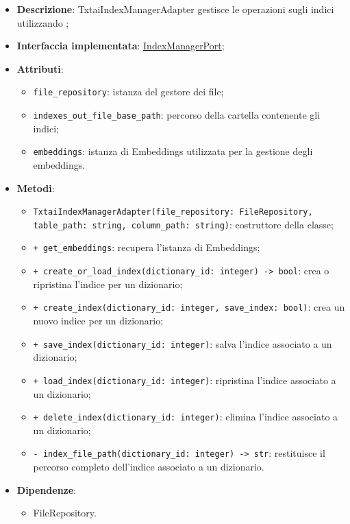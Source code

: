 \begin{itemize}
    \item \textbf{Descrizione}: TxtaiIndexManagerAdapter gestisce le operazioni  sugli indici utilizzando ;
    \item \textbf{Interfaccia implementata}: \hyperref[IndexManagerPort]{IndexManagerPort};
    \item \textbf{Attributi}:
    \begin{itemize}
        \item \texttt{file\_repository}: istanza del gestore dei file;
        \item \texttt{indexes\_out\_file\_base\_path}: percorso della cartella contenente gli indici;
        \item \texttt{embeddings}: istanza di Embeddings utilizzata per la gestione degli embeddings.
    \end{itemize}
    \item \textbf{Metodi}:
    \begin{itemize}
        \item \texttt{TxtaiIndexManagerAdapter(file\_repository: FileRepository, table\_path: string, column\_path: string)}: costruttore della classe;
        \item \texttt{+ get_embeddings}: recupera l'istanza di Embeddings;
        \item \texttt{+ create\_or\_load\_index(dictionary_id: integer) -> bool}: crea o ripristina l'indice per un dizionario;
        \item \texttt{+ create\_index(dictionary_id: integer, save_index: bool)}: crea un nuovo indice per un dizionario;
        \item \texttt{+ save\_index(dictionary_id: integer)}: salva l'indice associato a un dizionario;
        \item \texttt{+ load\_index(dictionary_id: integer)}: ripristina l'indice associato a un dizionario;
        \item \texttt{+ delete\_index(dictionary_id: integer)}: elimina l'indice associato a un dizionario;
        \item \texttt{- index\_file\_path(dictionary_id: integer) -> str}: restituisce il percorso completo dell'indice associato a un dizionario.
    \end{itemize}
    \item \textbf{Dipendenze}:
    \begin{itemize}
        \item FileRepository.
    \end{itemize}
\end{itemize} 

